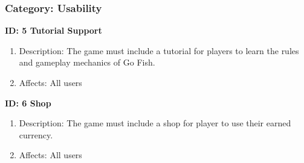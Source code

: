 \subsubsection{Category: Usability}

\textbf{ID: 5 Tutorial Support}
\begin{enumerate}
    \item Description: The game must include a tutorial for players to learn the rules and gameplay mechanics of Go Fish.
    \item Affects: All users
\end{enumerate}

\textbf{ID: 6 Shop}
\begin{enumerate}
    \item Description: The game must include a shop for player to use their earned currency.
    \item Affects: All users
\end{enumerate}
